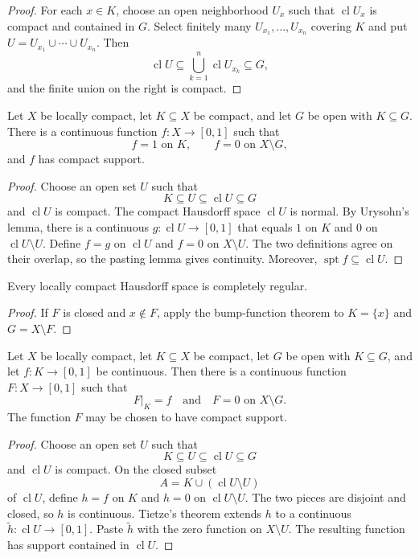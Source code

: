 \begin{proof}
For each $x\in K$, choose an open neighborhood $U_x$ such that
$\operatorname{cl}U_x$ is compact and contained in $G$. Select finitely many
$U_{x_1},\ldots,U_{x_n}$ covering $K$ and put
$U=U_{x_1}\cup\cdots\cup U_{x_n}$. Then
\[
\operatorname{cl}U
\subseteq
\bigcup_{k=1}^n\operatorname{cl}U_{x_k}
\subseteq G,
\]
and the finite union on the right is compact.
\end{proof}

\begin{thm}
Let $X$ be locally compact, let $K\subseteq X$ be compact, and let $G$ be open
with $K\subseteq G$. There is a continuous function $f:X\to[0,1]$ such that
\[
f=1\text{ on }K,
\qquad
f=0\text{ on }X\setminus G,
\]
and $f$ has compact support.
\end{thm}

\begin{proof}
Choose an open set $U$ such that
\[
K\subseteq U\subseteq\operatorname{cl}U\subseteq G
\]
and $\operatorname{cl}U$ is compact. The compact Hausdorff space
$\operatorname{cl}U$ is normal. By Urysohn's lemma, there is a continuous
$g:\operatorname{cl}U\to[0,1]$ that equals $1$ on $K$ and $0$ on
$\operatorname{cl}U\setminus U$. Define $f=g$ on $\operatorname{cl}U$ and
$f=0$ on $X\setminus U$. The two definitions agree on their overlap, so the
pasting lemma gives continuity. Moreover,
$\operatorname{spt}f\subseteq\operatorname{cl}U$.
\end{proof}

\begin{cor}
Every locally compact Hausdorff space is completely regular.
\end{cor}

\begin{proof}
If $F$ is closed and $x\notin F$, apply the bump-function theorem to
$K=\{x\}$ and $G=X\setminus F$.
\end{proof}

\begin{thm}
Let $X$ be locally compact, let $K\subseteq X$ be compact, let $G$ be open
with $K\subseteq G$, and let $f:K\to[0,1]$ be continuous. Then there is a
continuous function $F:X\to[0,1]$ such that
\[
F|_K=f
\quad\text{and}\quad
F=0\text{ on }X\setminus G.
\]
The function $F$ may be chosen to have compact support.
\end{thm}

\begin{proof}
Choose an open set $U$ such that
\[
K\subseteq U\subseteq\operatorname{cl}U\subseteq G
\]
and $\operatorname{cl}U$ is compact. On the closed subset
\[
A=K\cup(\operatorname{cl}U\setminus U)
\]
of $\operatorname{cl}U$, define $h=f$ on $K$ and $h=0$ on
$\operatorname{cl}U\setminus U$. The two pieces are disjoint and closed, so
$h$ is continuous. Tietze's theorem extends $h$ to a continuous
$\widetilde h:\operatorname{cl}U\to[0,1]$. Paste $\widetilde h$ with the zero
function on $X\setminus U$. The resulting function has support contained in
$\operatorname{cl}U$.
\end{proof}

